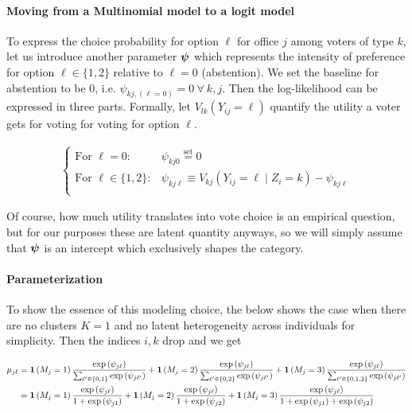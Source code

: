\documentclass[11pt]{article}
\begin{document}
\paragraph{Moving from a Multinomial model to a logit model} To express the choice probability for option \(\ell\) for office \(j\) among voters of type \(k\), let us introduce another parameter \(\bm{\psi}\) which represents the intensity of preference for option \(\ell \in \{1, 2\}\) relative to \(\ell = 0\) (abstention). We set the baseline for abstention to be 0, i.e. \(\psi_{kj,(\ell=0)} = 0 ~\forall~ k, j\).  Then the log-likelihood can be expressed in three parts. Formally, let \(V_{lk}(Y_{ij} = \ell)\) quantify the utility a voter gets for voting for voting for option \(\ell\).
 
\begin{align*}
\begin{cases}
\text{For }\ell = 0: & \psi_{kj0} \stackrel{\text{set}}{=} 0\\
\text{For }\ell \in \{1, 2\}: & \psi_{kj\ell} \equiv V_{kj}(Y_{ij} = \ell \mid Z_i = k) - \psi_{kj\ell}\\
\end{cases}
\end{align*}

Of course, how much utility translates into vote choice is an empirical question, but for our purposes these are latent quantity anyways, so we will simply assume that \(\bm{\psi}\) is an intercept which exclusively shapes the category.


\paragraph{Parameterization} To show the essence of this modeling choice, the below shows the case when there are no clusters \(K = 1\) and no latent heterogeneity across individuals for simplicity. Then the indices \(i, k\) drop and we get

\begin{align}
\mu_{j\ell} &= \bm{1}\left(M_{j}= 1\right)\frac{\exp{(\psi_{j\ell}})}{\sum_{\ell^\prime \in \{0, 1\}}\exp{(\psi_{j\ell^\prime})}} +\bm{1}\left(M_{j}= 2\right)\frac{\exp{(\psi_{j\ell})}}{\sum_{\ell^\prime \in \{0, 2\}}\exp{(\psi_{j\ell^\prime}})}\nonumber +\bm{1}\left(M_{j}= 3\right)\frac{\exp{(\psi_{j\ell}})}{\sum_{\ell^\prime \in \{0, 1, 2\}}\exp{(\psi_{j\ell^\prime}})}\nonumber\\
&= \bm{1}\left(M_{j}= 1\right)\frac{\exp{(\psi_{j\ell})}}{1 + \exp{(\psi_{j1})}} +\bm{1}\left(M_{j}= 2\right)\frac{\exp{(\psi_{j\ell})}}{1 + \exp{(\psi_{j2})}} +\bm{1}\left(M_{j}= 3\right)\frac{\exp{(\psi_{j\ell})}}{1 + \exp{(\psi_{j1})} + \exp{(\psi_{j2}})}\nonumber
\end{align}
\end{document}
